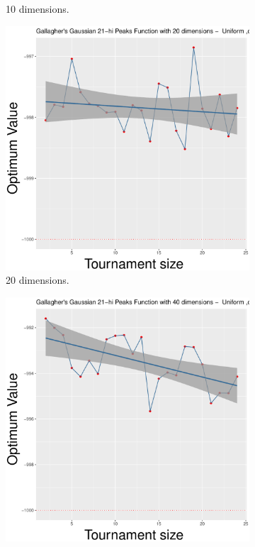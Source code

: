 \begin{figure}[t]
\begin{subfigure}[b]{0.33\textwidth}
		\caption{10 dimensions.}
	\end{subfigure}
	\begin{subfigure}[b]{0.33\textwidth}
		\centering
		\includegraphics[width=\textwidth]{img/uniform-20D/multimodal_uniform_22_dim_20.pdf}
		\caption{20 dimensions.}
	\end{subfigure}
	\begin{subfigure}[b]{0.33\textwidth}
		\centering
		\includegraphics[width=\textwidth]{img/uniform-40D/multimodal_uniform_22_dim_40.pdf}

\end{subfigure}
\end{figure}
